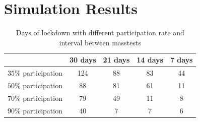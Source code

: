\documentclass
[
    a4paper,
    11pt,
    bibliography = totoc,
    listof = totoc,
    headinclude = true,
]
{scrreprt}
\begin{document}
\chapter{Simulation Results}

\begin{table}[!h]
{\small%
\begin{center}
\begin{tabular}{|c||c|c|c|c|}
 \hline
 & 30 days    & 21 days   & 14 days  & 7 days  \\
  \hline
  \hline
      $35\%$ participation    & 124 &  88&  83  & 44   \\
  \hline
      $50\%$ participation & 88 & 81 & 61 & 11 \\
  \hline
      $70\%$ participation & 79 &  49 & 11 & 8 \\
  \hline
      $90\%$ participation & 40 &7 &7  & 6\\
      \hline
\end{tabular}
\end{center}
}%

\caption{Days of lockdown with different participation rate and interval between masstests}
\end{table}
\end{document}
